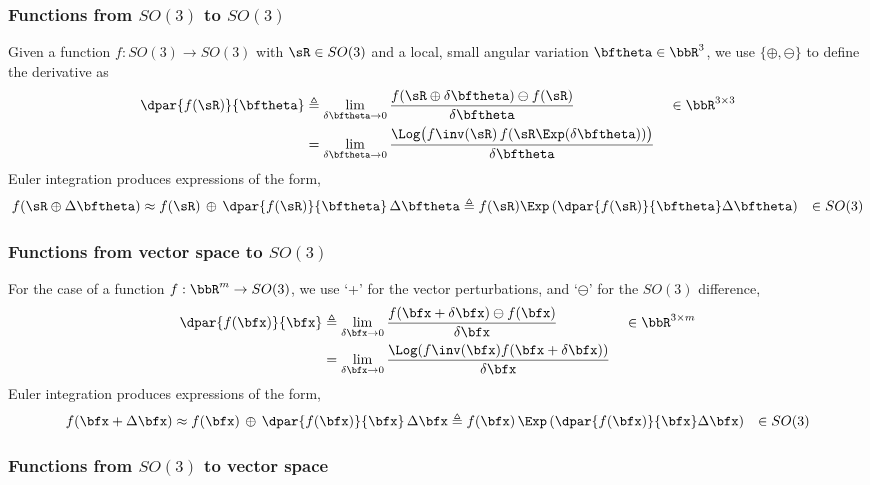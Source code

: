\subsubsection{Functions from $SO(3)$ to $SO(3)$}

Given a function $f:SO(3) \to SO(3)$ with $\sR\in SO(3)$ and a local, small angular variation $\bth\in\bbR^3$, we use $\{\oplus,\ominus\}$ to define the derivative as
%
\begin{align}
\dpar{f(\sR)}{\bth} 
&\te \lim_{\delta\bth\to0}\frac{f(\sR\oplus\delta\bth)\ominus f(\sR)}{\delta\bth}  && \in \bbR^{3\times 3}\\
&= \lim_{\delta\bth\to0}\frac{\Log\big(f\inv(\sR)\,f(\sR\Exp(\delta\bth))\big)}{\delta\bth} \label{equ:derivative_SO3}
\end{align}
%
Euler integration produces expressions of the form,
%
\begin{align*}
f(\sR\oplus\Delta\bth) &\approx f(\sR)\,\oplus\,\dpar{f(\sR)}{\bth}\,\Delta\bth
 \te f(\sR)\Exp\left(\dpar{f(\sR)}{\bth}\Delta\bth\right)
 & \in SO(3)
\end{align*}




\subsubsection{Functions from vector space to $SO(3)$}

For the case of a function $f:\bbR^m\to SO(3)$, we use `+' for the vector perturbations, and `$\ominus$' for the $SO(3)$ difference,
%
\begin{align}
\dpar{f(\bfx)}{\bfx} &\te \lim_{\delta\bfx\to0} \frac{ f(\bfx+\delta\bfx)\ominus f(\bfx)}{\delta\bfx} && \in \bbR^{3\times m} \label{equ:dif_RtoSO3}\\
&= \lim_{\delta\bfx\to0} \frac{\Log(f\inv(\bfx) f(\bfx+\delta\bfx))}{\delta\bfx}
\end{align}
%
Euler integration produces expressions of the form,
%
\begin{align*}
f(\bfx+\Delta\bfx) &\approx f(\bfx)\,\oplus\,\dpar{f(\bfx)}{\bfx}\,\Delta\bfx
 \te f(\bfx)\,\Exp\left(\dpar{f(\bfx)}{\bfx}\Delta\bfx\right)
 & \in SO(3)
\end{align*}

\subsubsection{Functions from $SO(3)$ to vector space}

